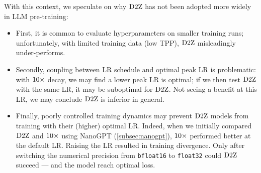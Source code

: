 With this context, we speculate on why $\mbox{D2Z}$ has not been adopted
more widely in LLM pre-training:
\begin{itemize}[leftmargin=*]
  \item First, it is common to evaluate hyperparameters on smaller
    training runs; unfortunately, with limited training data (low
    TPP), $\mbox{D2Z}$ misleadingly under-performs.
\item Secondly, coupling between LR schedule and optimal peak LR is
  problematic: with $\mbox{10}\times$ decay, we may find a lower peak LR is
  optimal; if we then test $\mbox{D2Z}$ with the same LR, it may be
  suboptimal for $\mbox{D2Z}$.  Not seeing a benefit at this LR, we may
  conclude $\mbox{D2Z}$ is inferior in general.
\item Finally, poorly controlled training dynamics may prevent
  $\mbox{D2Z}$ models from training with their (higher) optimal LR.
  Indeed, when we initially compared $\mbox{D2Z}$ and $\mbox{10}\times$ using NanoGPT
  (\cref{subsec:nanogpt}), $\mbox{10}\times$ performed better at the default
  LR\@.  Raising the LR resulted in training divergence.  Only after
  switching the numerical precision from \verb|bfloat16|
  to \verb|float32| could $\mbox{D2Z}$ succeed --- and the model reach
  optimal loss.
\end{itemize}

%
%
%


